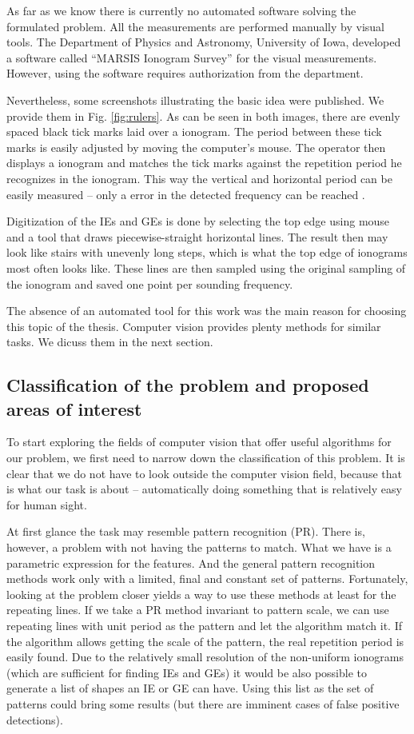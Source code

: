 As far as we know there is currently no automated software solving the formulated problem. All the measurements are performed manually by visual tools. The Department of Physics and Astronomy, University of Iowa, developed a software called ``MARSIS Ionogram Survey'' for the visual measurements. However, using the software requires authorization from the department.

Nevertheless, some screenshots illustrating the basic idea were published. We provide them in Fig. \ref{fig:rulers}. As can be seen in both images, there are evenly spaced black tick marks laid over a ionogram. The period between these tick marks is easily adjusted by moving the computer's mouse. The operator then displays a ionogram and matches the tick marks against the repetition period he recognizes in the ionogram. This way the vertical and horizontal period can be easily measured -- only a  error in the detected frequency can be reached \citep[p.~2]{Duru2008}.

Digitization of the IEs and GEs is done by selecting the top edge using mouse and a tool that draws piecewise-straight horizontal lines. The result then may look like stairs with unevenly long steps, which is what the top edge of ionograms most often looks like. These lines are then sampled using the original sampling of the ionogram and saved one point per sounding frequency.

The absence of an automated tool for this work was the main reason for choosing this topic of the thesis. Computer vision provides plenty methods for similar tasks. We dicuss them in the next section.

\subsection{Classification of the problem and proposed areas of interest}
To start exploring the fields of computer vision that offer useful algorithms for our problem, we first need to narrow down the classification of this problem. It is clear that we do not have to look outside the computer vision field, because that is what our task is about -- automatically doing something that is relatively easy for human sight. 

At first glance the task may resemble pattern recognition (PR). There is, however, a problem with not having the patterns to match. What we have is a parametric expression for the features. And the general pattern recognition methods work only with a limited, final and constant set of patterns. Fortunately, looking at the problem closer yields a way to use these methods at least for the repeating lines. If we take a PR method invariant to pattern scale, we can use repeating lines with unit period as the pattern and let the algorithm match it. If the algorithm allows getting the scale of the pattern, the real repetition period is easily found. Due to the relatively small resolution of the non-uniform ionograms (which are sufficient for finding IEs and GEs) it would be also possible to generate a list of shapes an IE or GE can have. Using this list as the set of patterns could bring some results (but there are imminent cases of false positive detections). 

